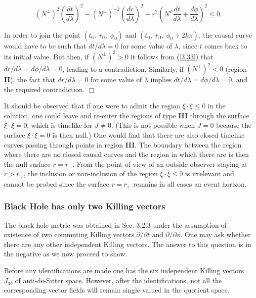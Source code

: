 \documentclass[12pt]{article}
\newcounter{c1} \newcounter{c2}
\newcommand{\bb}{\begin{equation}}
\newcommand{\ee}{\end{equation}}
\begin{document}
\bb
(N^{\perp})^2\left( \frac{dt}{d\lambda}\right)^2 -(N^{\perp})^{-2}\left(
\frac{dr}{d\lambda} \right)^2
-r^2\left( N^{\phi}\frac{dt}{d\lambda} +\frac{d\phi}{d\lambda} \right)^2
\leq 0.
\label{3.33}
\ee

In order to join the point $(t_0,\; r_0,\; \phi_0)$ and $(t_0,\;
r_0,\; \phi_0 +2k\pi)$, the causal curve would have to be such
that $dt/d\lambda =0$ for some value of $\lambda$, since
$t$ comes back to its initial value. But then, if $(N^{\perp})^2 > 0$ it
follows from (\ref{3.33}) that $dr/d\lambda = d\phi/d\lambda
=0$, leading to a contradiction.  Similarly, if $(N^{\perp})^2 <0$ (region
{\bf II}), the fact that $dr/d\lambda =0$ for some value
of $\lambda$ implies $dt/d\lambda= d\phi/d\lambda =0$, and the
required contradiction.  $\Box$

It should be observed that if one were to admit the region $\xi
\cdot \xi \leq 0$ in the solution, one could leave and re-enter
the regions of type {\bf III} through the surface $\xi \cdot \xi
=0$, which is timelike for $J \neq 0$. (This is not possible
when $J=0$ because the surface $\xi \cdot \xi =0$ is then null.)
One would find that there are also closed timelike curves
passing through points in region {\bf III}. The boundary between
the region where there are no closed causal curves and the
region in which there are is then the null surface $r=r_{-}$. From the point
of view of an outside observer staying at $r>r_{+}$, the inclusion or
 non-inclusion of the region  $\xi
\cdot \xi \leq 0$  is irrelevant and cannot be probed since the surface $r =
 r_{+}$ remains in all cases an event horizon.


\subsubsection{Black Hole has only two Killing vectors}

The black hole metric was obtained in Sec. 3.2.3 under the assumption of
existence
 of two commuting Killing vectors $\partial/\partial t$ and $\partial/\partial
 \phi$. One may ask whether there are any other independent Killing vectors.
The answer to this question is in the negative as we now proceed to show.

Before any identifications are made one has the six independent Killing
vectors
 $J_{ab}$ of anti-de-Sitter space. However, after the identifications, not all
 the corresponding vector fields will remain single valued in the quotient
 space.
\end{document}

